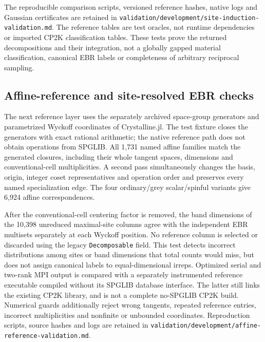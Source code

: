 \documentclass[11pt]{article}
\begin{document}
The reproducible comparison scripts, versioned reference hashes,
native logs and Gaussian certificates are retained in
\texttt{validation/development/site-induction-validation.md}.
The reference tables are test oracles, not runtime dependencies or
imported CP2K classification tables. These tests prove the returned
decompositions and their integration, not a globally gapped material
classification, canonical EBR labels or completeness of arbitrary
reciprocal sampling.

\subsection{Affine-reference and site-resolved EBR checks}
The next reference layer uses the separately archived space-group
generators and parametrized Wyckoff coordinates of Crystalline.jl.
The test fixture closes the generators with exact rational arithmetic;
the native reference path does not obtain operations from SPGLIB.
All 1,731 named affine families match the generated closures, including
their whole tangent spaces, dimensions and conventional-cell
multiplicities. A second pass simultaneously changes the basis,
origin, integer coset representatives and operation order and preserves
every named specialization edge. The four ordinary/grey scalar/spinful
variants give 6,924 affine correspondences.

After the conventional-cell centering factor is removed, the band
dimensions of the 10,398 unreduced maximal-site columns agree with
the independent EBR multisets separately at each Wyckoff position.
No reference column is selected or discarded using the legacy
\texttt{Decomposable} field. This test detects incorrect distributions
among sites or band dimensions that total counts would miss, but
does not assign canonical labels to equal-dimensional irreps.
Optimized serial and two-rank MPI output is compared with a separately
instrumented reference executable compiled without its SPGLIB database
interface. The latter still links the existing CP2K library, and is
not a complete no-SPGLIB CP2K build. Numerical guards additionally
reject wrong tangents, repeated reference entries, incorrect
multiplicities and nonfinite or unbounded coordinates. Reproduction
scripts, source hashes and logs are retained in
\texttt{validation/development/affine-reference-validation.md}.
\end{document}
